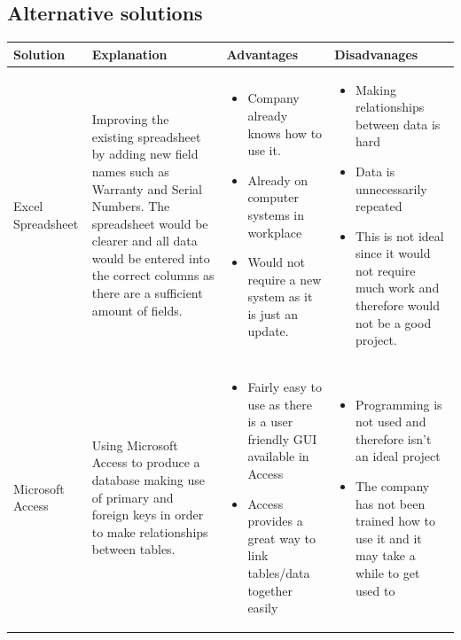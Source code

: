 \subsection{Alternative solutions}
\begin{center}
\begin{longtable}{|p{2.5cm}|p{3cm}|p{3.2cm}|p{3.2cm}|}
\hline
\textbf{Solution} & \textbf{Explanation} & \textbf{Advantages} & \textbf{Disadvanages} \\ \hline
Excel Spreadsheet & Improving the existing spreadsheet by adding new field names such as Warranty and Serial Numbers. The spreadsheet would be clearer and all data would be entered into the correct columns as there are a sufficient amount of fields. & \begin{itemize} \item Company already knows how to use it. \item Already on computer systems in workplace \item Would not require a new system as it is just an update. \end{itemize} & \begin{itemize} \item Making relationships between data  is hard \item Data is unnecessarily repeated \item This is not ideal since it would not require much work and therefore would not be a good project. \end{itemize}  \\ \hline
Microsoft Access & Using Microsoft Access to produce a database making use of primary and foreign keys in order to make relationships between tables. & \begin{itemize} \item Fairly easy to use as there is a user friendly GUI available in Access \item Access provides a  great way to link tables/data together easily \end{itemize} &  \begin{itemize} \item Programming is not used and therefore isn't an ideal project \item The company has not been trained how to use it and it may take a while to get used to  \end{itemize}  \\ \hline

\end{longtable}
\end{center}
